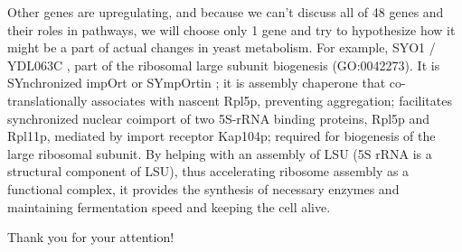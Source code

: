 \documentclass{article}
\begin{document}
 Other genes are upregulating, and because we can't discuss all of 48 genes and their roles in pathways, we will choose only 1 gene and try to hypothesize how it might be a part of actual changes in yeast metabolism. For example, SYO1 / YDL063C \cite{41}, part of the ribosomal large subunit biogenesis (GO:0042273). It is SYnchronized impOrt or SYmpOrtin ; it is assembly chaperone that co-translationally associates with nascent Rpl5p, preventing aggregation; facilitates synchronized nuclear coimport of two 5S-rRNA binding proteins, Rpl5p and Rpl11p, mediated by import receptor Kap104p; required for biogenesis of the large ribosomal subunit. By helping with an assembly of LSU (5S rRNA is a structural component of LSU), thus accelerating ribosome assembly as a functional complex, it provides the synthesis of necessary enzymes and maintaining fermentation speed and keeping the cell alive.
 
 
 Thank you for your attention!
 
\end{document}
